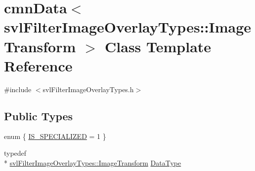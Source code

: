 \hypertarget{classcmn_data_3_01svl_filter_image_overlay_types_1_1_image_transform_01_4}{\section{cmn\-Data$<$ svl\-Filter\-Image\-Overlay\-Types\-:\-:Image\-Transform $>$ Class Template Reference}
\label{classcmn_data_3_01svl_filter_image_overlay_types_1_1_image_transform_01_4}
}


{\ttfamily \#include $<$svl\-Filter\-Image\-Overlay\-Types.\-h$>$}

\subsection*{Public Types}
\begin{DoxyCompactItemize}
\item 
enum \{ \hyperlink{classcmn_data_3_01svl_filter_image_overlay_types_1_1_image_transform_01_4_aa11ad1851e906a2bd3a0f100bebfd52ea19f4b42a979d0470b8d1b2861a0f1e89}{I\-S\-\_\-\-S\-P\-E\-C\-I\-A\-L\-I\-Z\-E\-D} = 1
 \}
\item 
typedef \\*
\hyperlink{classsvl_filter_image_overlay_types_1_1_image_transform}{svl\-Filter\-Image\-Overlay\-Types\-::\-Image\-Transform} \hyperlink{classcmn_data_3_01svl_filter_image_overlay_types_1_1_image_transform_01_4_a58a4f448e85eeba8ac6a226c91e752d7}{Data\-Type}
\end{DoxyCompactItemize}
